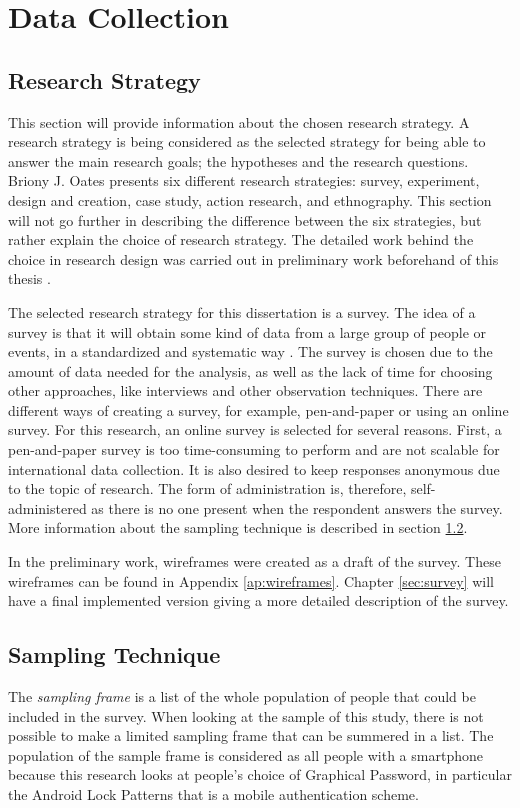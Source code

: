 \chapter{Data Collection}\label{chap:experiment}
  
  \clearpage
  \section{Research Strategy}\label{sec:researchStrategy}
    This section will provide information about the chosen research strategy. A research strategy is being considered as the selected strategy for being able to answer the main research goals; the hypotheses and the research questions. Briony J. Oates \cite{empiriske} presents six different research strategies: survey, experiment, design and creation, case study, action research, and ethnography. This section will not go further in describing the difference between the six strategies, but rather explain the choice of research strategy. The detailed work behind the choice in research design was carried out in preliminary work beforehand of this thesis \cite{prosjektoppgave}.

    The selected research strategy for this dissertation is a survey. The idea of a survey is that it will obtain some kind of data from a large group of people or events, in a standardized and systematic way \cite{empiriske}. The survey is chosen due to the amount of data needed for the analysis, as well as the lack of time for choosing other approaches, like interviews and other observation techniques. There are different ways of creating a survey, for example, pen-and-paper or using an online survey. For this research, an online survey is selected for several reasons. First, a pen-and-paper survey is too time-consuming to perform and are not scalable for international data collection. It is also desired to keep responses anonymous due to the topic of research. The form of administration is, therefore, self-administered as there is no one present when the respondent answers the survey. More information about the sampling technique is described in section \ref{sec:samplingTechnique}.

    In the preliminary work, wireframes were created as a draft of the survey. These wireframes can be found in Appendix \ref{ap:wireframes}. Chapter \ref{sec:survey} will have a final implemented version giving a more detailed description of the survey.

  \section{Sampling Technique}\label{sec:samplingTechnique}
    The {\it sampling frame} is a list of the whole population of people that could be included in the survey. When looking at the sample of this study, there is not possible to make a limited sampling frame that can be summered in a list. The population of the sample frame is considered as all people with a smartphone because this research looks at people's choice of Graphical Password, in particular the Android Lock Patterns that is a mobile authentication scheme.

